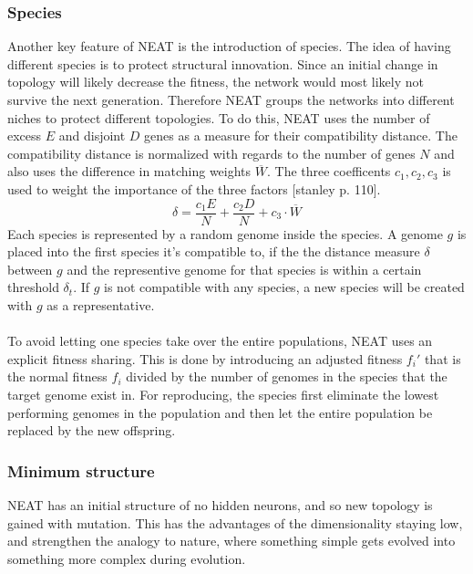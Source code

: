 \documentclass[11pt, a4paper]{article}
\begin{document}
\subsubsection{Species}
Another key feature of NEAT is the introduction  of species. The idea of having different species is to protect structural innovation. Since an initial change in topology will likely decrease the fitness, the network would most likely not survive the next generation. Therefore NEAT groups the networks into different niches to protect different topologies. To do this, NEAT uses the number of excess $ E $ and disjoint $ D $ genes as a measure for their compatibility distance. The compatibility distance is normalized with regards to the number of genes $ N $ and also uses the difference in matching weights $ \overline{W} $. The three coefficents $ c_1, c_2, c_3$ is used to weight the importance of the three factors [stanley p. 110].
\begin{equation}
\delta = \dfrac{c_1E}{N}+\dfrac{c_2D}{N}+c_3\cdot\overline{W}
\end{equation}
Each species is represented by a random genome inside the species. A genome $ g $ is placed into the first species it's compatible to, if the the distance measure $ \delta $ between $ g $ and the representive genome for that species is within a certain threshold $ \delta_t $. If $ g $ is not compatible with any species, a new species will be created with $ g $ as a representative.
\\
\\
To avoid letting one species take over the entire populations, NEAT uses an explicit fitness sharing. This is done by introducing an adjusted fitness $ f_i'$ that is the normal fitness $ f_i $ divided by the number of genomes in the species that the target genome exist in. For reproducing, the species first eliminate the lowest performing genomes in the population and then let the entire population be replaced by the new offspring.
\subsubsection{Minimum structure}
NEAT has an initial structure of no hidden neurons, and  so new topology is gained with mutation. This has the advantages of the dimensionality staying low, and strengthen the analogy to nature, where something simple gets evolved into something more complex during evolution.
\end{document}
